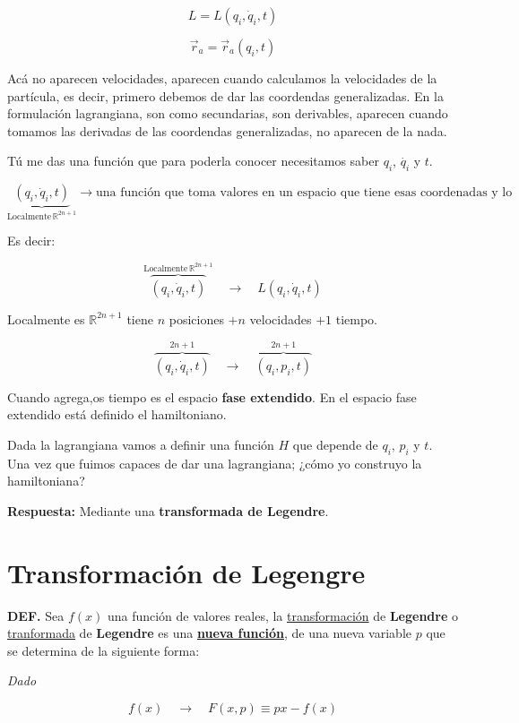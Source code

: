 \documentclass{article}
\begin{document}
\[ L = L(q_{i},\dot{q}_{i},t) \]


\[ \vec{r}_{a} = \vec{r}_{a}(q_{i},t)  \]

Acá no aparecen velocidades, aparecen cuando calculamos la velocidades de la partícula, es decir, primero debemos de dar las coordendas generalizadas. En la formulación lagrangiana, son como secundarias, son derivables, aparecen cuando tomamos las derivadas de las coordendas generalizadas, no aparecen de la nada.

Tú me das una función que para poderla conocer necesitamos saber $q_{i}$, $\dot{q_{i}}$ y $t$.

\[\underbrace{(q_{i},\dot{q}_{i},t)}_{\text{Localmente}\, \mathbb{R}^{2n+1} }  \to \text{una función que toma valores en un espacio que tiene esas coordenadas y lo asocia a una función escalar} \]

Es decir:

\[ \overbrace{(q_{i}, \dot{q}_{i},t)}^{\text{Localmente}\, \mathbb{R}^{2n+1}} \quad \to \quad L(q_{i},\dot{q}_{i},t) \]

Localmente es $\mathbb{R}^{2n+1}$ tiene $n$ posiciones $+n$ velocidades $+1$ tiempo.

\[  \overbrace{(q_{i}, \dot{q}_{i}, t)}^{2n+1} \quad \to \quad \overbrace{(q_{i},p_{i},t)}^{2n+1} \]

Cuando agrega,os tiempo es el espacio \textbf{fase extendido}. En el espacio fase extendido está definido el hamiltoniano.

Dada la lagrangiana vamos a definir una función $H$ que depende de $q_{i}$, $p_{i}$ y $t$. Una vez que fuimos capaces de dar una lagrangiana; ¿cómo yo construyo la hamiltoniana?

\textcolor{Cerulean}{\textbf{Respuesta:}} Mediante una \textbf{transformada de Legendre}.

\section{Transformación de Legengre}

\textbf{DEF.} Sea $f(x)$ una función de valores reales, la \underline{transformación} de \textbf{Legendre} o \underline{tranformada} de \textbf{Legendre} es una \textcolor{Cinnabar}{\underline{\textcolor{onyx}{\textbf{nueva función}}}}, de una nueva variable $p$ que se determina de la siguiente forma:


\emph{Dado}

\[ f(x) \quad \to \quad F(x,p) \equiv px-f(x) \]
\end{document}
